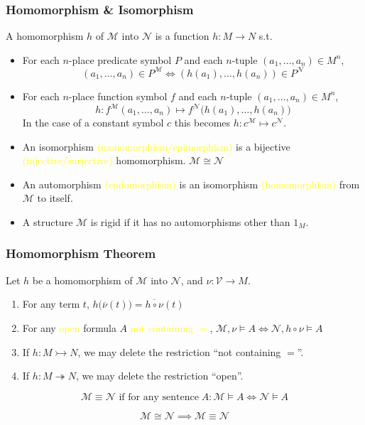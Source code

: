 \documentclass[UTF8,11pt,colorlinks,compress,openany]{beamer}%
\begin{document}
\begin{frame}\frametitle{Homomorphism \& Isomorphism}
\setlength\abovedisplayskip{0pt}
\setlength\belowdisplayskip{0pt}
	\begin{definition}[Homomorphism]
		A homomorphism $h$ of $\mathcal{M}$ into $\mathcal{N}$ is a function $h: M\to N$ s.t.
		\begin{itemize}
			\item For each $n$-place predicate symbol $P$ and each $n$-tuple $(a_1,\dots,a_n)\in M^n$,
			\[(a_1,\dots,a_n)\in P^{\mathcal{M}}\iff(h(a_1),\dots,h(a_n))\in P^{\mathcal{N}}\]
			\item For each $n$-place function symbol $f$ and each $n$-tuple $(a_1,\dots,a_n)\in M^n$,
			\[h: f^{\mathcal{M}}(a_1,\dots,a_n)\mapsto f^{\mathcal{N}}\bigl(h(a_1),\dots,h(a_n)\bigr)\]
			In the case of a constant symbol $c$ this becomes $h: c^{\mathcal{M}}\mapsto c^{\mathcal{N}}$.
		\end{itemize}
	\end{definition}
	\begin{itemize}
		\item An isomorphism \textcolor{yellow}{(monomorphism/epimorphism)} is a bijective \textcolor{yellow}{(injective/surjective)} homomorphism. $\mathcal{M}\cong\mathcal{N}$
		\item An automorphism \textcolor{yellow}{(endomorphism)} is an isomorphism \textcolor{yellow}{(homomorphism)} from $\mathcal{M}$ to itself.
		\item A structure $\mathcal{M}$ is rigid if it has no automorphisms other than $1_M$.
	\end{itemize}
\end{frame}

\begin{frame}\frametitle{Homomorphism Theorem}
	\begin{theorem}
		Let $h$ be a homomorphism of $\mathcal{M}$ into $\mathcal{N}$, and $\nu: \mathcal{V}\to M$.
		\begin{enumerate}
			\item For any term $t$, $h\bigl(\overline{\nu}(t)\bigr)=\overline{h\circ\nu}(t)$
			\item For any \textcolor{yellow}{open} formula $A$ \textcolor{yellow}{not containing $=$}, $\mathcal{M},\nu\vDash A\iff\mathcal{N},h\circ\nu\vDash A$
			\item If $h: M\rightarrowtail N$, we may delete the restriction ``not containing $=$''.
			\item If $h: M\twoheadrightarrow N$, we may delete the restriction ``open''.
		\end{enumerate}
	\end{theorem}
	\begin{definition}
		\[\mathcal{M}\equiv\mathcal{N} \text{ if for any sentence}\; A: \mathcal{M}\vDash A\iff\mathcal{N}\vDash A\]
	\end{definition}
	\[\mathcal{M}\cong\mathcal{N}\implies\mathcal{M}\equiv\mathcal{N}\]
\end{frame}
\end{document}
